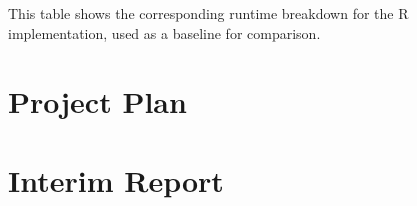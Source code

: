 \documentclass[a4paper]{report}
\begin{document}
This table shows the corresponding runtime breakdown for the R implementation,
used as a baseline for comparison.

\begin{center}
\end{center}

\chapter{Project Plan}


\chapter{Interim Report}

\end{document}
